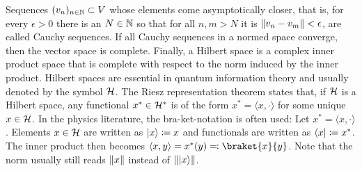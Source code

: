 Sequences $(v_n)_{n\in \mathbb{N}} \subset V$ whose elements come asymptotically closer, that is, for every $\epsilon > 0$ there is an $N\in \mathbb{N}$ so that for all $n,m>N$ it is $\lVert v_n - v_m\rVert<\epsilon$, are called Cauchy sequences. If all Cauchy sequences in a normed space converge, then the vector space is complete. Finally, a Hilbert space is a complex inner product space that is complete with respect to the norm induced by the inner product. Hilbert spaces are essential in quantum information theory and usually denoted by the symbol $\mathcal{H}$. The Riesz representation theorem states that, if $\mathcal{H}$ is a Hilbert space, any functional $x^* \in \mathcal{H}^*$ is of the form $x^*= \langle x, \cdot \rangle$ for some unique $x\in \mathcal{H}$. In the physics literature, the bra-ket-notation is often used: Let $x^* = \langle x, \cdot \rangle$. Elements $x \in \mathcal{H}$ are written as $\lvert x\rangle \coloneqq x$ and functionals are written as $\langle x\rvert\coloneqq x^*$. The inner product then becomes $\langle x, y \rangle = x^*(y)\eqqcolon \braket{x}{y}$. Note that the norm usually still reads $\lVert x\rVert$ instead of $\lVert\lvert x\rangle\rVert$.

